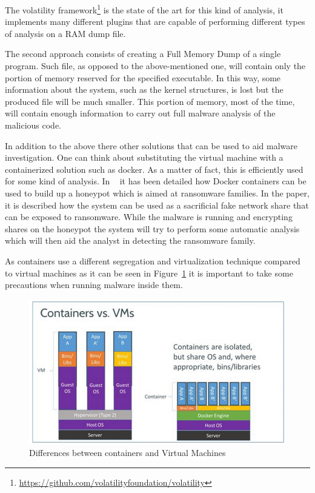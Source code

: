 The volatility framework\footnote{\url{https://github.com/volatilityfoundation/volatility}} is the state of the art for this kind of analysis, it implements many different plugins that are capable of performing different types of analysis on a RAM dump file. 

The second approach consists of creating a Full Memory Dump of a single program. Such file, as opposed to the above-mentioned one, will contain only the portion of memory reserved for the specified executable. In this way, some information about the system, such as the kernel structures, is lost but the produced file will be much smaller. This portion of memory, most of the time, will contain enough information to carry out full malware analysis of the malicious code. 

In addition to the above there other solutions that can be used to aid malware investigation. One can think about substituting the virtual machine with a containerized solution such as docker. As a matter of fact, this is efficiently used for some kind of analysis. In ~\cite{9042158} it has been detailed how Docker containers can be used to build up a honeypot which is aimed at ransomware families. In the paper, it is described how the system can be used as a sacrificial fake network share that can be exposed to ransomware. While the malware is running and encrypting shares on the honeypot the system will try to perform some automatic analysis which will then aid the analyst in detecting the ransomware family.

As containers use a different segregation and virtualization technique compared to virtual machines as it can be seen in Figure~\ref{fig:dockvm} it is important to take some precautions when running malware inside them. 

\begin{figure}[htp]
\centering
\includegraphics[width=\linewidth]{images/dockervm.png}
\caption{Differences between containers and Virtual Machines}
\label{fig:dockvm}
\end{figure}

